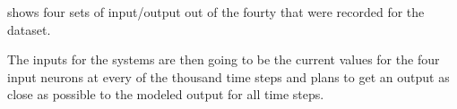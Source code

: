 shows four sets of input/output out of the fourty that were recorded for the dataset.

The inputs for the systems are then going to be the current values for the four input neurons at every of the thousand time steps and plans to get an output as close as possible to the modeled output for all time steps.
